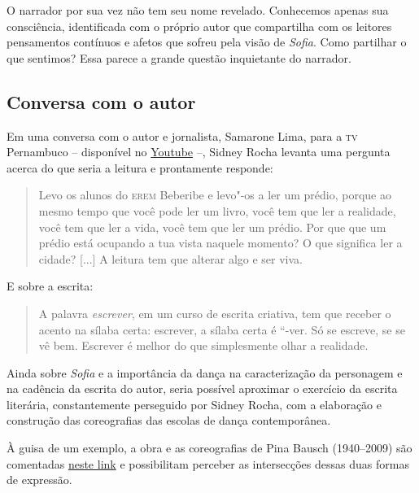 \documentclass[12pt]{extarticle}
\begin{document}
O narrador por sua vez não tem seu nome revelado. Conhecemos apenas sua
consciência, identificada com o próprio autor
que compartilha com os leitores pensamentos contínuos e afetos que sofreu
pela visão de \textit{Sofia}. Como partilhar o que sentimos? 
Essa parece a grande questão inquietante do narrador.  

\subsection{Conversa com o autor}

Em uma conversa com o autor e jornalista, Samarone Lima, para a \textsc{tv} Pernambuco --
disponível no  
\href{https://www.youtube.com/watch?v=wLNc8aGLM5Q&ab_channel=TVPernambuco}{Youtube} --, Sidney Rocha 
levanta uma pergunta acerca do que seria a leitura e prontamente responde:

 \begin{quote}

Levo os alunos do \textsc{erem} Beberibe e levo"-os a ler um prédio, porque ao mesmo tempo 
que você pode ler um livro, você tem que ler a realidade, você tem que ler a vida, 
você tem que ler um prédio. 
Por que que um prédio está ocupando a tua vista naquele momento? 
O que significa ler a cidade? 
{[}...{]}
A leitura tem que alterar algo e ser viva. 

\end{quote} 

E sobre a escrita: 

\begin{quote}

A palavra \textit{escrever}, em um curso de escrita criativa, tem que receber o acento 
na sílaba certa: escrever, a sílaba certa é ``-ver.
Só se escreve, se se vê bem. 
Escrever é melhor do que simplesmente olhar a realidade. 

\end{quote} 

Ainda sobre \textit{Sofia} e a importância da dança na caracterização da personagem e na 
cadência da escrita do autor, seria possível aproximar o exercício da escrita literária, 
constantemente perseguido por Sidney Rocha, com a elaboração e construção das coreografias 
das escolas de dança contemporânea. 

À guisa de um exemplo, a obra e as coreografias de Pina Bausch (1940--2009) são comentadas 
\href{https://www.youtube.com/watch?v=hh8cUsdz1fU&ab_channel=AndresNeumann}{neste link} e 
possibilitam perceber as intersecções dessas duas formas de expressão. 
\end{document}
